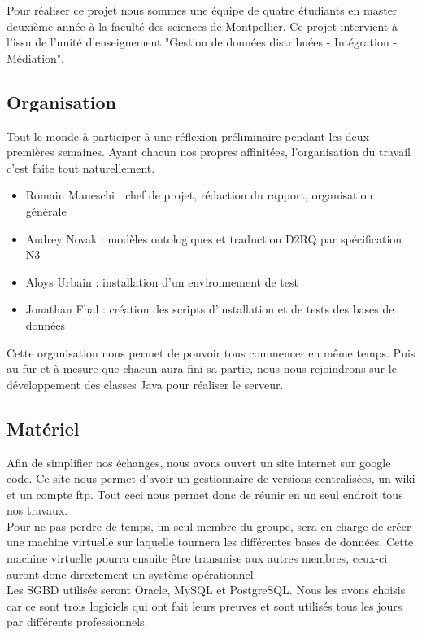 \documentclass[12pt]{article}
\begin{document}
	Pour réaliser ce projet nous sommes une équipe de quatre étudiants en master deuxième année à la faculté des sciences de Montpellier. Ce projet intervient à l'issu de l'unité d'enseignement "Gestion de données distribuées - Intégration - Médiation".

\subsection{Organisation}

	Tout le monde à participer à une réflexion préliminaire pendant les deux premières semaines.
	Ayant chacun nos propres affinitées, l'organisation du travail c'est faite tout naturellement.\\
	\begin{itemize}
		\item Romain Maneschi : chef de projet, rédaction du rapport, organisation générale\\
		\item Audrey Novak : modèles ontologiques et traduction D2RQ par spécification N3\\
		\item Aloys Urbain : installation d'un environnement de test\\
		\item Jonathan Fhal : création des scripts d'installation et de tests des bases de données\\
	\end{itemize}
	
	Cette organisation nous permet de pouvoir tous commencer en même temps. Puis au fur et à mesure que chacun aura fini sa partie, nous nous rejoindrons sur le développement des classes Java pour réaliser le serveur.

\subsection{Matériel}

	Afin de simplifier nos échanges, nous avons ouvert un site internet sur google code. Ce site nous permet d'avoir un gestionnaire de versions centralisées, un wiki et un compte ftp. Tout ceci nous permet donc de réunir en un seul endroit tous nos travaux.\\
	\indent Pour ne pas perdre de temps, un seul membre du groupe, sera en charge de créer une machine virtuelle sur laquelle tournera les différentes bases de données. Cette machine virtuelle pourra ensuite être transmise aux autres membres, ceux-ci auront donc directement un système opérationnel.\\
	\indent Les SGBD utilisés seront Oracle, MySQL et PostgreSQL. Nous les avons choisis car ce sont trois logiciels qui ont fait leurs preuves et sont utilisés tous les jours par différents professionnels. 
	
\end{document}
